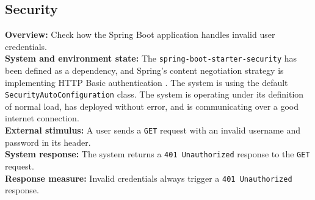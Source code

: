 \subsection*{Security}

\textbf{Overview:} Check how the Spring Boot application handles invalid user credentials.\\

\textbf{System and environment state:} The \texttt{spring-boot-starter-security} has been defined as a dependency, and Spring's content negotiation strategy is implementing HTTP Basic authentication \cite{springBootSecurity}. The system is using the default \texttt{SecurityAutoConfiguration} class. The system is operating under its definition of normal load, has deployed without error, and is communicating over a good internet connection.\\

\textbf{External stimulus:} A user sends a \texttt{GET} request with an invalid username and password in its header.\\

\textbf{System response:} The system returns a \texttt{401 Unauthorized} response to the \texttt{GET} request.\\

\textbf{Response measure:} Invalid credentials always trigger a \texttt{401 Unauthorized} response.
